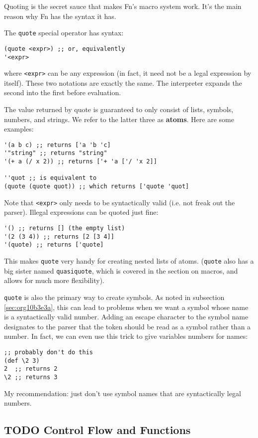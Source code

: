 \documentclass[11pt]{article}
\begin{document}
Quoting is the secret sauce that makes Fn's macro system work. It's the main
reason why Fn has the syntax it has.

The \texttt{quote} special operator has syntax:
\begin{verbatim}
(quote <expr>) ;; or, equivalently
'<expr>
\end{verbatim}
where \texttt{<expr>} can be any expression (in fact, it need not be a legal expression
by itself). These two notations are exactly the same. The interpreter expands
the second into the first before evaluation.

The value returned by quote is guaranteed to only consist of lists, symbols,
numbers, and strings. We refer to the latter three as \textbf{atoms}. Here are some
examples:
\begin{verbatim}
'(a b c) ;; returns ['a 'b 'c]
'"string" ;; returns "string"
'(+ a (/ x 2)) ;; returns ['+ 'a ['/ 'x 2]]

''quot ;; is equivalent to
(quote (quote quot)) ;; which returns ['quote 'quot]
\end{verbatim}

Note that \texttt{<expr>} only needs to be syntactically valid (i.e. not freak out the
parser). Illegal expressions can be quoted just fine:
\begin{verbatim}
'() ;; returns [] (the empty list)
'(2 (3 4)) ;; returns [2 [3 4]]
'(quote) ;; returns ['quote]
\end{verbatim}

This makes \texttt{quote} very handy for creating nested lists of atoms. (\texttt{quote} also has
a big sister named \texttt{quasiquote}, which is covered in the section on macros, and
allows for much more flexibility).

\texttt{quote} is also the primary way to create symbols. As noted in subsection \ref{sec:org10b3e3a}, this can lead to problems when we want a symbol whose name is a
syntactically valid number. Adding an escape character to the symbol name
designates to the parser that the token should be read as a symbol rather than a
number. In fact, we can even use this trick to give variables numbers for names:
\begin{verbatim}
;; probably don't do this
(def \2 3)
2  ;; returns 2
\2 ;; returns 3
\end{verbatim}

My recommendation: just don't use symbol names that are syntactically legal
numbers.


\subsection{{\bfseries\sffamily TODO} Control Flow and Functions}
\label{sec:org67814c5}
\end{document}

